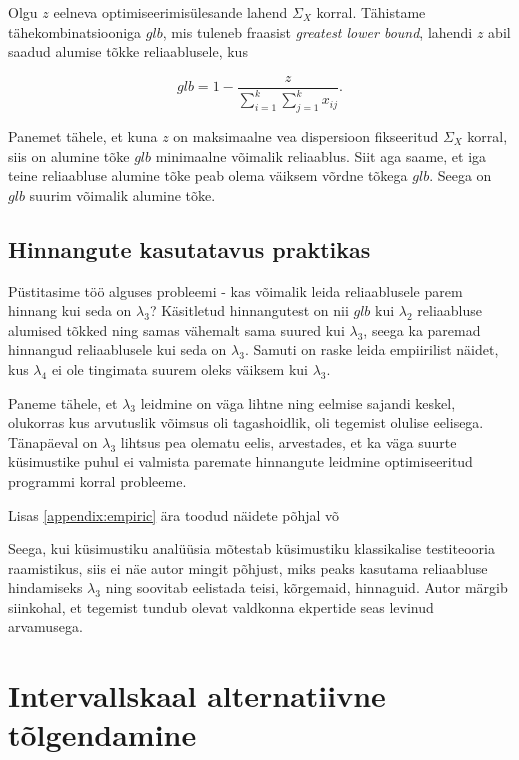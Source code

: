 \documentclass[a4paper,12pt,oneside]{article}
\numberwithin{equation}{section}
\theoremstyle{definition}
\begin{document}
Olgu $z$ eelneva optimiseerimis\"ulesande lahend $\Sigma_X$ korral. Tähistame tähekombinatsiooniga $glb$, mis tuleneb fraasist \textit{greatest lower bound}, lahendi $z$ abil saadud alumise tõkke reliaablusele, kus 

\begin{equation*}
glb = 1 - \frac{z}{\sum \limits_{i=1}^k \sum \limits_{j=1}^k x_{ij}} \text{.}
\end{equation*}  

Panemet tähele, et kuna $z$ on maksimaalne vea dispersioon fikseeritud $\Sigma_X$ korral, siis on alumine tõke $glb$ minimaalne võimalik reliaablus. Siit aga saame, et iga teine reliaabluse alumine tõke peab olema väiksem võrdne tõkega $glb$. Seega on $glb$ suurim võimalik alumine tõke. 

\subsection{Hinnangute kasutatavus praktikas}

Püstitasime töö alguses probleemi - kas võimalik leida reliaablusele parem hinnang kui seda on $\lambda_3$? Käsitletud hinnangutest on nii $glb$ kui $\lambda_2$ reliaabluse alumised tõkked ning samas vähemalt sama suured kui $\lambda_3$, seega ka paremad hinnangud reliaablusele kui seda on $\lambda_3$. Samuti on raske leida empiirilist näidet, kus  $\lambda_4$ ei ole tingimata suurem oleks väiksem kui $\lambda_3$.

Paneme tähele, et $\lambda_3$ leidmine on väga lihtne ning eelmise sajandi keskel, olukorras kus arvutuslik võimsus oli tagashoidlik, oli tegemist olulise eelisega. Tänapäeval on $\lambda_3$ lihtsus pea olematu eelis, arvestades, et ka väga suurte küsimustike puhul ei valmista paremate hinnangute leidmine optimiseeritud programmi korral probleeme. 

Lisas \ref{appendix:empiric} ära toodud näidete põhjal võ

Seega, kui küsimustiku analüüsia mõtestab küsimustiku klassikalise testiteooria raamistikus, siis ei näe autor mingit põhjust, miks peaks kasutama reliaabluse hindamiseks $\lambda_3$ ning soovitab eelistada teisi, kõrgemaid, hinnaguid. Autor märgib siinkohal, et tegemist tundub olevat valdkonna ekpertide seas levinud arvamusega.  \cite{Revelle2008} \cite{Sijtsma2009a} \cite{Cronbach2004}




\section{Intervallskaal alternatiivne tõlgendamine}
\end{document}
